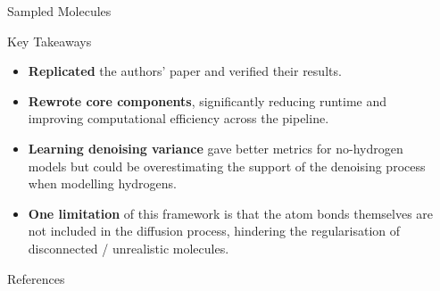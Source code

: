 \documentclass[final]{beamer}
\newlength{\sepwidth}
\newlength{\colwidth}
\newcommand{\separatorcolumn}{
  \begin{column}{\sepwidth}
\end{column}}
\begin{document}
\begin{frame}[t]
\begin{columns}[t]
\begin{column}{\colwidth}
\begin{block}{Sampled Molecules}
      \end{block}

      \begin{block}{Key Takeaways}

        \begin{itemize}
          \item \textbf{Replicated} the authors' paper and verified their results. \\
          \item \textbf{Rewrote core components}, significantly reducing runtime and improving computational efficiency across the pipeline. \\
          \item \textbf{Learning denoising variance} gave better metrics for no-hydrogen models but could be overestimating the support of the denoising process when modelling hydrogens. \\
          \item \textbf{One limitation} of this framework is that the atom bonds themselves are not included in the diffusion process, hindering the regularisation of disconnected / unrealistic molecules.
        \end{itemize}

      \end{block}



      \begin{block}{References}
        \nocite{*}
        \printbibliography

      \end{block}



    \end{column}

    \separatorcolumn
  \end{columns}
\end{frame}
\end{document}
